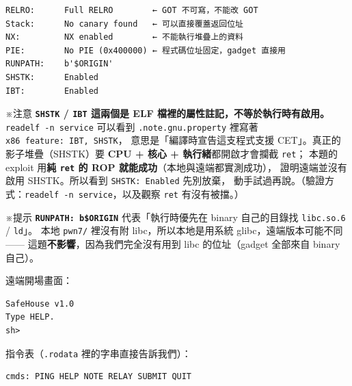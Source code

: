 \documentclass[10pt,a4paper]{article}
\renewenvironment{quote}{%
  \begin{mdframed}[linewidth=0pt,innerleftmargin=0pt,innerrightmargin=0pt,
    innerbottommargin=0pt,innertopmargin=0pt,skipabove=0.55em,skipbelow=0.55em,
    leftmargin=0.9em,rightmargin=0.4em,startcode={\color{quotebar}\vrule width 2.6pt},%
    endcode={}]%
  \itshape\color{black}%
}{%
  \end{mdframed}%
}
\begin{document}
\begin{Verbatim}[breaklines=true,breakanywhere=true,breakautoindent=false,fontsize=\fontsize{7.0}{9.5}\selectfont]
RELRO:      Full RELRO        ← GOT 不可寫，不能改 GOT
Stack:      No canary found   ← 可以直接覆蓋返回位址
NX:         NX enabled        ← 不能執行堆疊上的資料
PIE:        No PIE (0x400000) ← 程式碼位址固定，gadget 直接用
RUNPATH:    b'$ORIGIN'
SHSTK:      Enabled
IBT:        Enabled
\end{Verbatim}

\begin{quote}
※注意 \textbf{\texttt{SHSTK} / \texttt{IBT} 這兩個是 ELF
檔裡的屬性註記，不等於執行時有啟用。} \texttt{readelf\ \allowbreak{}-\allowbreak{}n\ \allowbreak{}service}
可以看到 \texttt{.\allowbreak{}note.\allowbreak{}gnu.\allowbreak{}property} 裡寫著
\texttt{x86\ \allowbreak{}feature:\allowbreak{}\ \allowbreak{}IBT,\allowbreak{}\ \allowbreak{}SHSTK}， 意思是「編譯時宣告這支程式支援
CET」。真正的影子堆疊（SHSTK）要 \textbf{CPU + 核心 +
執行緒}都開啟才會攔截 \texttt{ret}； 本題的 exploit 用\textbf{純
\texttt{ret} 的 ROP 就能成功}（本地與遠端都實測成功），
證明遠端並沒有啟用 SHSTK。所以看到 \texttt{SHSTK:\allowbreak{}\ \allowbreak{}Enabled} 先別放棄，
動手試過再說。（驗證方式：\texttt{readelf\ \allowbreak{}-\allowbreak{}n\ \allowbreak{}service}，以及觀察
\texttt{ret} 有沒有被擋。）
\end{quote}

\begin{quote}
※提示
\textbf{\texttt{RUNPATH:\allowbreak{}\ \allowbreak{}b\textquotesingle{}\allowbreak{}\$\allowbreak{}ORIGIN\textquotesingle{}\allowbreak{}}}
代表「執行時優先在 binary 自己的目錄找 \texttt{libc.\allowbreak{}so.\allowbreak{}6} /
\texttt{ld}」。 本地 \texttt{pwn7/} 裡沒有附 libc，所以本地是用系統
glibc，遠端版本可能不同 ------ 這題\textbf{不影響}，因為我們完全沒有用到
libc 的位址（gadget 全部來自 binary 自己）。
\end{quote}

遠端開場畫面：

\begin{Verbatim}[breaklines=true,breakanywhere=true,breakautoindent=false,fontsize=\fontsize{7.0}{9.5}\selectfont]
SafeHouse v1.0
Type HELP.
sh>
\end{Verbatim}

指令表（\texttt{.\allowbreak{}rodata} 裡的字串直接告訴我們）：

\begin{Verbatim}[breaklines=true,breakanywhere=true,breakautoindent=false,fontsize=\fontsize{7.0}{9.5}\selectfont]
cmds: PING HELP NOTE RELAY SUBMIT QUIT
\end{Verbatim}
\end{document}
